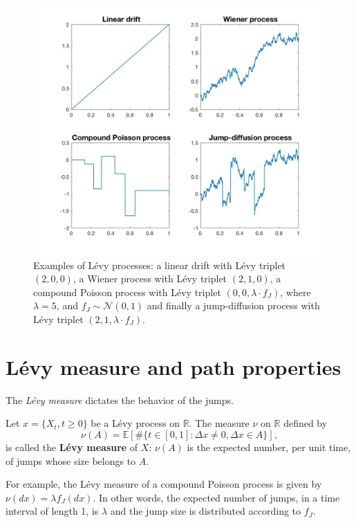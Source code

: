 \begin{figure}[!htb]
	\includegraphics[width=\textwidth]{gfx/processes_examples}
	\caption{Examples of L\'evy processes: a linear drift with L\'evy triplet $(2,0,0)$, a Wiener process with L\'evy triplet $(2,1,0)$, a compound Poisson process with L\'evy triplet $(0,0,\lambda\cdot f_J)$, where $\lambda = 5$, and $f_J\sim\mathcal{N}(0,1)$ and finally a jump-diffusion process with L\'evy triplet $(2,1,\lambda\cdot f_J)$.}
	\label{fig:Levy:examples}
\end{figure}

\section{L\'evy measure and path properties}
\label{sec:Levy:Levy_measure}
The \textit{L\'evy measure} dictates the behavior of the jumps.
\begin{defn}
Let $x = \{X_t,t\geq 0\}$ be a L\'evy process on $\mathbb{R}$. The measure $\nu$ on $\mathbb{R}$ defined by
$$\nu(A) = \mathbb{E}\left[\#\{t\in[0,1]:\Delta x \neq 0, \Delta x\in A\}\right],$$
is called the \textbf{L\'evy measure} of $X$: $\nu(A)$ is the expected number, per unit time, of jumps whose size belongs to $A$.
\end{defn}

For example, the L\'evy measure of a compound Poisson process is given by $\nu(dx) = \lambda f_J(dx)$. In other words, the expected number of jumps, in a time interval of length 1, is $\lambda$ and the jump size is distributed according to $f_J$.

